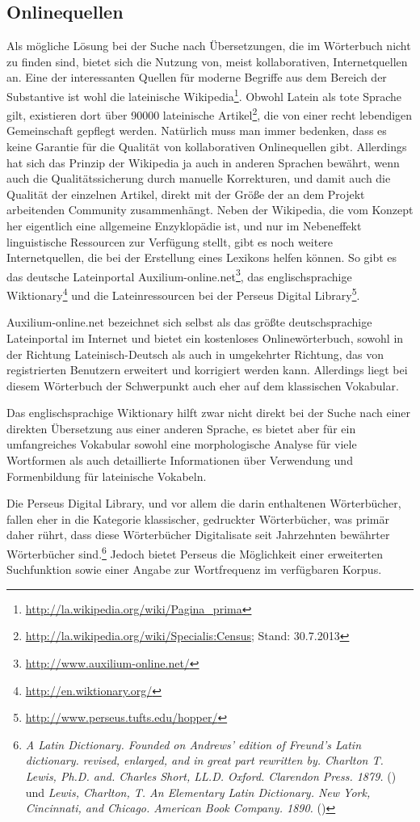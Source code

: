 \subsection{Onlinequellen}
\label{subsec:online}
Als mögliche Lösung bei der Suche nach Übersetzungen, die im Wörterbuch nicht zu finden sind, bietet sich die Nutzung von, meist  kollaborativen, Internetquellen an. Eine der interessanten Quellen für moderne Begriffe aus dem Bereich der Substantive ist wohl die lateinische Wikipedia\footnote{\url{http://la.wikipedia.org/wiki/Pagina\_prima}}. Obwohl Latein als tote Sprache gilt, existieren dort über 90000 lateinische Artikel\footnote{\url{http://la.wikipedia.org/wiki/Specialis:Census}; Stand: 30.7.2013}, die von einer recht lebendigen Gemeinschaft gepflegt werden. Natürlich muss man immer bedenken, dass es keine Garantie für die Qualität von kollaborativen Onlinequellen gibt. Allerdings hat sich das Prinzip der Wikipedia ja auch in anderen Sprachen bewährt, wenn auch die Qualitätssicherung durch manuelle Korrekturen, und damit auch die Qualität der einzelnen Artikel, direkt mit der Größe der an dem Projekt arbeitenden Community zusammenhängt. Neben der Wikipedia, die vom Konzept her eigentlich eine allgemeine Enzyklopädie ist, und nur im Nebeneffekt linguistische Ressourcen zur Verfügung stellt, gibt es noch weitere Internetquellen, die bei der Erstellung eines Lexikons helfen können. So gibt es das deutsche Lateinportal Auxilium-online.net\footnote{\url{http://www.auxilium-online.net/}}, das englischsprachige Wiktionary\footnote{\url{http://en.wiktionary.org/}} und die Lateinressourcen bei der Perseus Digital Library\footnote{\url{http://www.perseus.tufts.edu/hopper/}}. \par
Auxilium-online.net bezeichnet sich selbst als das größte deutschsprachige Lateinportal im Internet und bietet ein kostenloses Onlinewörterbuch, sowohl in der Richtung Lateinisch-Deutsch als auch in umgekehrter Richtung, das von registrierten Benutzern erweitert und korrigiert werden kann. Allerdings liegt bei diesem Wörterbuch der Schwerpunkt auch eher auf dem klassischen Vokabular. \par
Das englischsprachige Wiktionary hilft zwar nicht direkt bei der Suche nach einer direkten Übersetzung aus einer anderen Sprache, es bietet aber für ein umfangreiches Vokabular sowohl eine morphologische Analyse für viele Wortformen als auch detaillierte Informationen über Verwendung und Formenbildung für lateinische Vokabeln. \par
Die Perseus Digital Library, und vor allem die darin enthaltenen Wörterbücher, fallen eher in die Kategorie klassischer, gedruckter Wörterbücher, was primär daher rührt, dass diese Wörterbücher Digitalisate seit Jahrzehnten bewährter Wörterbücher sind.\footnote{\textit{A Latin Dictionary. Founded on Andrews' edition of Freund's Latin dictionary. revised, enlarged, and in great part rewritten by. Charlton T. Lewis, Ph.D. and. Charles Short, LL.D. Oxford. Clarendon Press. 1879.} (\persalatin) und \textit{Lewis, Charlton, T. An Elementary Latin Dictionary. New York, Cincinnati, and Chicago. American Book Company. 1890.} (\perselemlat)} Jedoch bietet Perseus die Möglichkeit einer erweiterten Suchfunktion sowie einer Angabe zur Wortfrequenz im verfügbaren Korpus. \par
